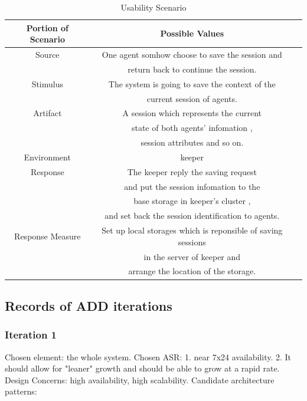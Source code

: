 \documentclass{article}
\begin{document}
	\begin{center}
		\begin{table}[!htb]
		\begin{tabular}{ccc}
		\toprule  
		Portion of Scenario & Possible Values\\
		\midrule 
		Source 				& One agent somhow choose to save the session and \\
							& return back to continue the session.\\
		Stimulus 			& The system is going to save the context of the \\
							& current session of agents.\\
		Artifact 			& A session which represents the current \\
							& state of both agents' infomation , \\
							& session attributes and so on.\\
		Environment 		& keeper \\
		Response 			& The keeper reply the saving request \\
							& and put the session infomation to the \\
							& base storage in keeper's cluster , \\
							& and set back the session identification to agents.\\
		Response Measure 	& Set up local storages which is reponsible of saving sessions\\
							&  in the server of keeper and  \\
							& arrange the location of the storage.\\
		\bottomrule
		\end{tabular}
		\caption{Usability Scenario}
		\end{table}
	\end{center}

	\subsection{Records of ADD iterations}
		\subsubsection{Iteration 1}
		Chosen element: the whole system.
		Chosen ASR: 
		1. near 7x24 availability.
		2. It should allow for "leaner" growth and should be able to grow at a rapid rate.
		Design Concerns: high  availability, high scalability.
		Candidate architecture patterns:\\
\end{document}
